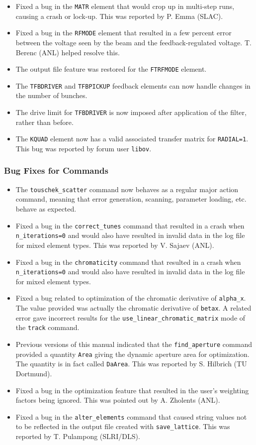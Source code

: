 \documentclass[11pt]{article}
\begin{document}
\begin{itemize}
\item Fixed a bug in the \verb|MATR| element that would crop up in multi-step runs, causing a crash or lock-up.
  This was reported by P. Emma (SLAC).
\item Fixed a bug in the \verb|RFMODE| element that resulted in a few percent error between the voltage seen by the beam and
  the feedback-regulated voltage. T. Berenc (ANL) helped resolve this.
\item The output file feature was restored for the \verb|FTRFMODE| element.
\item The \verb|TFBDRIVER| and \verb|TFBPICKUP| feedback elements can now handle changes in the number of bunches.
\item The drive limit for \verb|TFBDRIVER| is now imposed after application of the filter, rather than before.
\item The \verb|KQUAD| element now has a valid associated transfer matrix for \verb|RADIAL=1|. This bug was reported
  by forum user \verb|libov|.
\end{itemize}

\subsubsection{Bug Fixes for Commands}
\begin{itemize}
\item The \verb|touschek_scatter| command now behaves as a regular major action command, meaning that error generation, scanning,
  parameter loading, etc.  behave as expected.
\item Fixed a bug in the \verb|correct_tunes| command that resulted in a crash when \verb|n_iterations=0| and would also have
  resulted in invalid data in the log file for mixed element types. This was reported by V. Sajaev (ANL).
\item Fixed a bug in the \verb|chromaticity| command that resulted in a crash when \verb|n_iterations=0| and would also have
  resulted in invalid data in the log file for mixed element types.
\item Fixed a bug related to optimization of the chromatic derivative of \verb|alpha_x|. The value provided was actually the
  chromatic derivative of \verb|betax|. A related error gave incorrect results for the \verb|use_linear_chromatic_matrix| mode of 
  the \verb|track| command.
\item Previous versions of this manual indicated that the \verb|find_aperture| command provided a quantity \verb|Area| giving
  the dynamic aperture area for optimization. The quantity is in fact called \verb|DaArea|. This was reported by S. Hilbrich (TU Dortmund).
\item Fixed a bug in the optimization feature that resulted in the user's weighting factors being ignored. This was pointed out
  by A. Zholents (ANL).
\item Fixed a bug in the \verb|alter_elements| command that caused string values not to be reflected in the output file created
  with \verb|save_lattice|. This was reported by T. Pulampong (SLRI/DLS).
\end{itemize}
\end{document}
